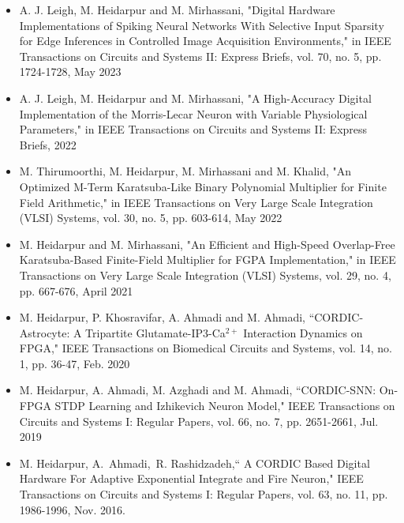 \begin {itemize}
\begin {itemize}
\begin {itemize}
                    \vspace{0.3cm}
                    \item [-]  A. J. Leigh, M. Heidarpur and M. Mirhassani, "Digital Hardware Implementations of Spiking Neural Networks With Selective Input Sparsity for Edge Inferences in Controlled Image Acquisition Environments," in IEEE Transactions on Circuits and Systems II: Express Briefs, vol. 70, no. 5, pp. 1724-1728, May 2023
                    \vspace{0.3cm}
                    \item [-]  A. J. Leigh, M. Heidarpur and M. Mirhassani, "A High-Accuracy Digital Implementation of the Morris-Lecar Neuron with Variable Physiological Parameters," in IEEE Transactions on Circuits and Systems II: Express Briefs, 2022
                    \vspace{0.3cm}
                    \item [-]  M. Thirumoorthi, M. Heidarpur, M. Mirhassani and M. Khalid, "An Optimized M-Term Karatsuba-Like Binary Polynomial Multiplier for Finite Field Arithmetic," in IEEE Transactions on Very Large Scale Integration (VLSI) Systems, vol. 30, no. 5, pp. 603-614, May 2022
                    \vspace{0.3cm}
                    \item [-]  M. Heidarpur and M. Mirhassani, "An Efficient and High-Speed Overlap-Free Karatsuba-Based Finite-Field Multiplier for FGPA Implementation," in IEEE Transactions on Very Large Scale Integration (VLSI) Systems, vol. 29, no. 4, pp. 667-676, April 2021
                    \vspace{0.3cm}
                    \item [-]    M. Heidarpur, P. Khosravifar, A. Ahmadi and M. Ahmadi, ``CORDIC-Astrocyte: A Tripartite 
                    Glutamate-IP3-Ca$^{2+}$
                     Interaction Dynamics on FPGA," IEEE Transactions on Biomedical Circuits and Systems, vol. 14, no. 1, pp. 36-47, Feb. 2020 
                    \vspace{0.3cm}
                     \item [-]   M. Heidarpur, A. Ahmadi, M. Azghadi and M. Ahmadi, ``CORDIC-SNN: On-FPGA STDP Learning and
                    Izhikevich Neuron Model," IEEE Transactions on Circuits and Systems I: Regular Papers,  vol. 66, no. 7, pp. 2651-2661, Jul. 2019 
                    \vspace{0.3cm}
                     \item [-]     M. Heidarpur, A.~Ahmadi,~R. Rashidzadeh,`` A CORDIC Based Digital Hardware For Adaptive Exponential Integrate and Fire Neuron," IEEE Transactions on Circuits and Systems I: Regular Papers, vol. 63, no. 11, pp. 1986-1996, Nov. 2016.

\end{itemize}
\end{itemize}
\end{itemize}
